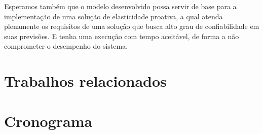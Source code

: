 \documentclass[twoside,english,brazilian]{UNISINOSmonografia}
\begin{document}
Esperamos também que o modelo desenvolvido possa servir de base para a implementação de uma solução de elasticidade proativa, a qual atenda plenamente os requisitos de uma solução que busca alto grau de confiabilidade em suas previsões. E tenha uma execução com tempo aceitável, de forma a não comprometer o desempenho do sistema.

\section{Trabalhos relacionados}

\section{Cronograma}






\end{document}
